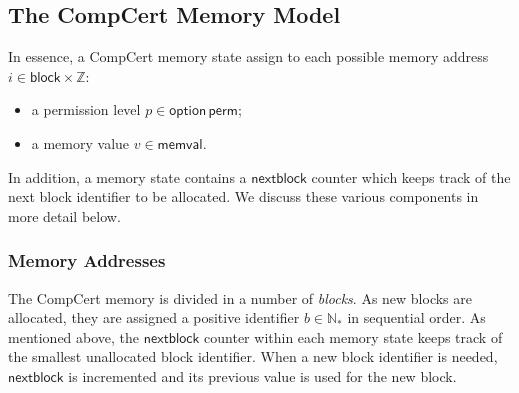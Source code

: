 \documentclass[acmsmall,screen,review,anonymous]{acmart}
\newcommand{\kw}[1]{\ensuremath{ \mathsf{#1} }}
\begin{document}


\subsection{The CompCert Memory Model}

In essence,
a CompCert memory state
assign to each possible memory address $i \in \kw{block} \times \mathbb{Z}$:
\begin{itemize}
  \item a permission level $p \in \kw{option}\,\kw{perm}$;
  \item a memory value $v \in \kw{memval}$.
\end{itemize}
In addition,
a memory state contains a $\kw{nextblock}$ counter
which keeps track of the next block identifier to be allocated.
We discuss these various components in more detail below.

\subsubsection{Memory Addresses}

The CompCert memory is divided in a number of \emph{blocks}.
As new blocks are allocated,
they are assigned a positive identifier $b \in \mathbb{N}_*$
in sequential order.
As mentioned above,
the $\kw{nextblock}$ counter within each memory state
keeps track of the smallest unallocated block identifier.
When a new block identifier is needed,
$\kw{nextblock}$ is incremented and its previous value
is used for the new block.
\end{document}
